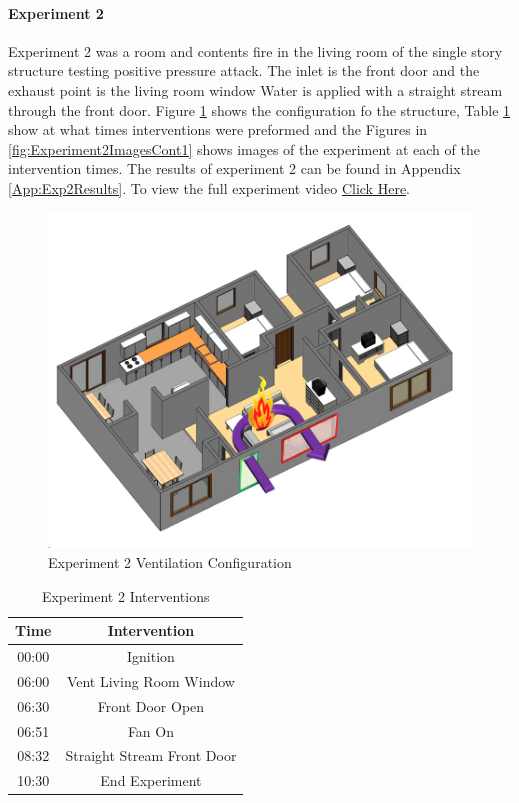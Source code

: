 \documentclass{article}
\begin{document}
\paragraph{Experiment 2}\mbox{}

Experiment 2 was a room and contents fire in the living room of the single story structure testing positive pressure attack. The inlet is the front door and the exhaust point is the living room window Water is applied with a straight stream through the front door. Figure \ref{fig:Exp2VentConfig} shows the configuration fo the structure, Table \ref{Table:Exp2Interventions} show at what times interventions were preformed and the Figures in \ref{fig:Experiment2ImagesCont1} shows images of the experiment at each of the intervention times. The results of experiment 2 can be found in Appendix \ref{App:Exp2Results}. To view the full experiment video \href{https://youtu.be/B-GvQX4JoAc}{Click Here}.

\begin{figure}[H]
	\centering
	\includegraphics[width=5in]{0_Images/FireExperiments/Single_Story/Experiment_2.jpg}
	\caption{Experiment 2 Ventilation Configuration}
	\label{fig:Exp2VentConfig}
\end{figure}

\begin{table}[H]
	\centering
	\caption{Experiment 2 Interventions}
	\begin{tabular}{|c|c|} 
		\hline
		Time & Intervention \\ \hline \hline
		00:00 & Ignition \\ \hline
		06:00 & Vent Living Room Window\\ \hline
		06:30 & Front Door Open \\ \hline
		06:51 & Fan On \\ \hline
		08:32 & Straight Stream Front Door \\ \hline
		10:30 & End Experiment \\ \hline
	\end{tabular}
	\label{Table:Exp2Interventions}
\end{table}
\end{document}
